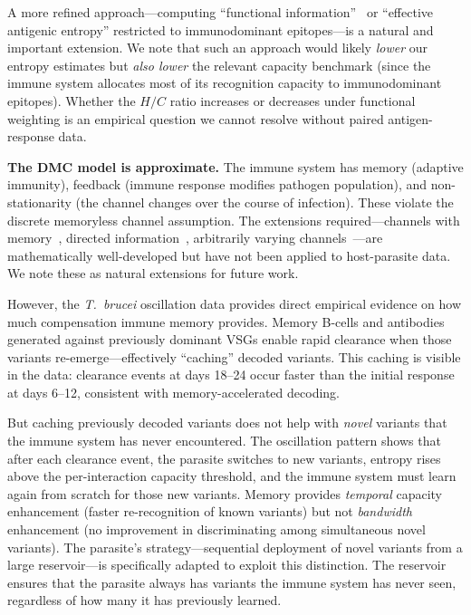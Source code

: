 \documentclass[twocolumn,10pt]{article}
\begin{document}
A more refined approach---computing ``functional information''~\citep{szostak2003} or ``effective antigenic entropy'' restricted to immunodominant epitopes---is a natural and important extension.  We note that such an approach would likely \emph{lower} our entropy estimates but \emph{also lower} the relevant capacity benchmark (since the immune system allocates most of its recognition capacity to immunodominant epitopes).  Whether the $H/C$ ratio increases or decreases under functional weighting is an empirical question we cannot resolve without paired antigen-response data.

\textbf{The DMC model is approximate.}  The immune system has memory (adaptive immunity), feedback (immune response modifies pathogen population), and non-stationarity (the channel changes over the course of infection).  These violate the discrete memoryless channel assumption.  The extensions required---channels with memory~\citep{verdu1994}, directed information~\citep{massey1990}, arbitrarily varying channels~\citep{csiszar1988}---are mathematically well-developed but have not been applied to host-parasite data.  We note these as natural extensions for future work.

However, the \textit{T.~brucei} oscillation data provides direct empirical evidence on how much compensation immune memory provides.  Memory B-cells and antibodies generated against previously dominant VSGs enable rapid clearance when those variants re-emerge---effectively ``caching'' decoded variants.  This caching is visible in the data: clearance events at days 18--24 occur faster than the initial response at days 6--12, consistent with memory-accelerated decoding.

But caching previously decoded variants does not help with \emph{novel} variants that the immune system has never encountered.  The oscillation pattern shows that after each clearance event, the parasite switches to new variants, entropy rises above the per-interaction capacity threshold, and the immune system must learn again from scratch for those new variants.  Memory provides \emph{temporal} capacity enhancement (faster re-recognition of known variants) but not \emph{bandwidth} enhancement (no improvement in discriminating among simultaneous novel variants).  The parasite's strategy---sequential deployment of novel variants from a large reservoir---is specifically adapted to exploit this distinction.  The reservoir ensures that the parasite always has variants the immune system has never seen, regardless of how many it has previously learned.
\end{document}
